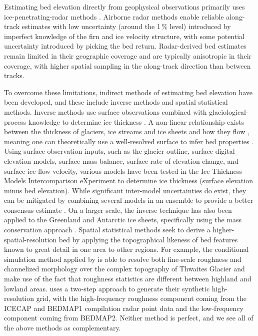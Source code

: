 Estimating bed elevation directly from geophysical observations primarily uses ice-penetrating-radar methods \citep[e.g.][]{RobinRadioechoexploration1970}.
Airborne radar methods enable reliable along-track estimates with low uncertainty (around the 1\,{\%} level) introduced by imperfect knowledge of the firn and ice velocity structure, with some potential uncertainty introduced by picking the bed return.
Radar-derived bed estimates remain limited in their geographic coverage \citep{FretwellBedmap2improvedice2013} and are typically anisotropic in their coverage, with higher spatial sampling in the along-track direction than between tracks.

To overcome these limitations, indirect methods of estimating bed elevation have been developed, and these include inverse methods and spatial statistical methods.
Inverse methods use surface observations combined with glaciological-process knowledge to determine ice thickness \citep[e.g.][]{vanPeltiterativeinversemethod2013}.
A non-linear relationship exists between the thickness of glaciers, ice streams and ice sheets and how they flow \citep{Raymondrelationshipsurfacebasal2005}, meaning one can theoretically use a well-resolved surface to infer bed properties \citep[e.g.][]{Farinottimethodestimateice2009}.
Using surface observation inputs, such as the glacier outline, surface digital elevation models, surface mass balance, surface rate of elevation change, and surface ice flow velocity, various models have been tested in the Ice Thickness Models Intercomparison eXperiment \citep[ITMIX;][]{FarinottiHowaccurateare2017} to determine ice thickness (surface elevation minus bed elevation).
While significant inter-model uncertainties do exist, they can be mitigated by combining several models in an ensemble to provide a better consensus estimate \citep{Farinotticonsensusestimateice2019}.
On a larger scale, the inverse technique has also been applied to the Greenland \citep{MorlighemBedMachinev3Complete2017} and Antarctic \citep{MorlighemDeepglacialtroughs2019} ice sheets, specifically using the mass conservation approach \citep{Morlighemmassconservationapproach2011}.
Spatial statistical methods seek to derive a higher-spatial-resolution bed by applying the topographical likeness of bed features known to great detail in one area to other regions.
For example, the conditional simulation method applied by \citet{GoffConditionalsimulationThwaites2014} is able to resolve both fine-scale roughness and channelized morphology over the complex topography of Thwaites Glacier and make use of the fact that roughness statistics are different between highland and lowland areas.
\citet{Grahamhighresolutionsyntheticbed2017} uses a two-step approach to generate their synthetic high-resolution grid, with the high-frequency roughness component coming from the ICECAP and BEDMAP1 compilation radar point data and the low-frequency component coming from BEDMAP2.
Neither method is perfect, and we see all of the above methods as complementary.

